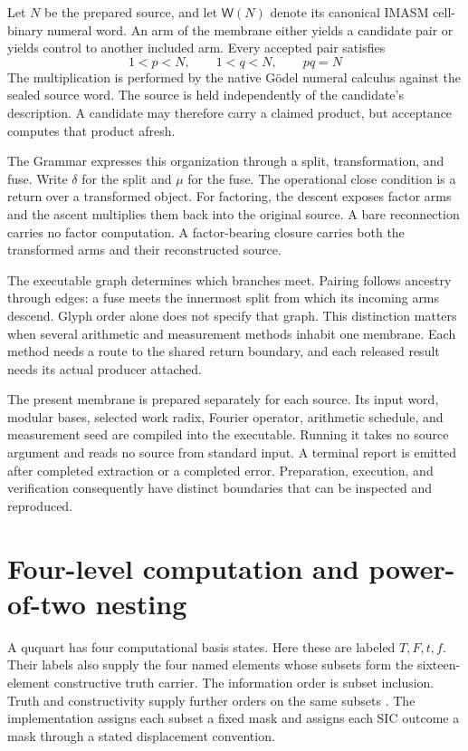 \documentclass[12pt]{article}
\newcommand{\W}{\mathsf{W}}
\begin{document}
Let $N$ be the prepared source, and let $\W(N)$ denote its canonical IMASM cell-binary numeral word. An arm of the membrane either yields a candidate pair or yields control to another included arm. Every accepted pair satisfies
\[
1<p<N,\qquad 1<q<N,\qquad pq=N
\]
The multiplication is performed by the native G\"odel numeral calculus against the sealed source word. The source is held independently of the candidate's description. A candidate may therefore carry a claimed product, but acceptance computes that product afresh.

The Grammar expresses this organization through a split, transformation, and fuse. Write $\delta$ for the split and $\mu$ for the fuse. The operational close condition is a return over a transformed object. For factoring, the descent exposes factor arms and the ascent multiplies them back into the original source. A bare reconnection carries no factor computation. A factor-bearing closure carries both the transformed arms and their reconstructed source.

The executable graph determines which branches meet. Pairing follows ancestry through edges: a fuse meets the innermost split from which its incoming arms descend. Glyph order alone does not specify that graph. This distinction matters when several arithmetic and measurement methods inhabit one membrane. Each method needs a route to the shared return boundary, and each released result needs its actual producer attached.

The present membrane is prepared separately for each source. Its input word, modular bases, selected work radix, Fourier operator, arithmetic schedule, and measurement seed are compiled into the executable. Running it takes no source argument and reads no source from standard input. A terminal report is emitted after completed extraction or a completed error. Preparation, execution, and verification consequently have distinct boundaries that can be inspected and reproduced.

\section*{Four-level computation and power-of-two nesting}

A ququart has four computational basis states. Here these are labeled $T,F,t,f$. Their labels also supply the four named elements whose subsets form the sixteen-element constructive truth carrier. The information order is subset inclusion. Truth and constructivity supply further orders on the same subsets \cite{trilattice}. The implementation assigns each subset a fixed mask and assigns each SIC outcome a mask through a stated displacement convention.
\end{document}
